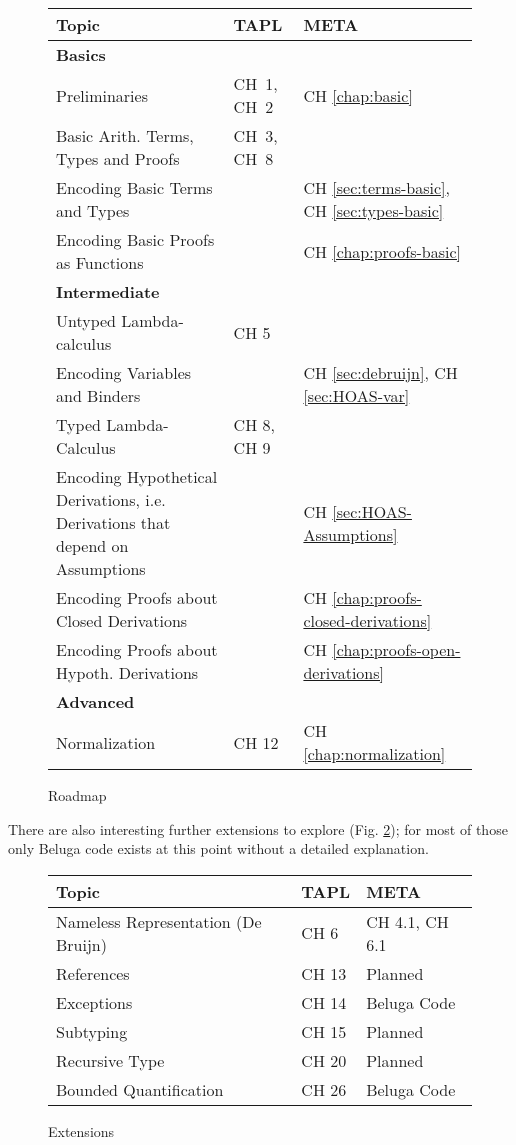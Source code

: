 \begin{figure}
  \centering
\begin{tabular}{p{8cm}|p{2.4cm}|p{3.25cm}}
 Topic & TAPL & META \\
\hline
\textbf{Basics} & & \\\hline\hline
Preliminaries & CH~1, CH~2 & CH \ref{chap:basic}\\
Basic Arith. Terms, Types and Proofs & CH~3, CH~8 &  \\
\hline
Encoding Basic Terms and Types & & CH \ref{sec:terms-basic}, CH \ref{sec:types-basic} \\
Encoding Basic Proofs as Functions & & CH \ref{chap:proofs-basic} \\
\hline  \hline
\textbf{Intermediate} & & \\\hline \hline
Untyped Lambda-calculus & CH 5  & \\
Encoding Variables and Binders & & CH \ref{sec:debruijn}, CH \ref{sec:HOAS-var} \\
\hline
Typed Lambda-Calculus & CH 8, CH 9  & \\
Encoding Hypothetical Derivations, i.e. Derivations that depend on
Assumptions & & CH \ref{sec:HOAS-Assumptions}\\
Encoding Proofs about Closed Derivations & & CH \ref{chap:proofs-closed-derivations} \\
Encoding Proofs about Hypoth. Derivations & & CH \ref{chap:proofs-open-derivations} \\
\hline\hline
\textbf{Advanced} & & \\\hline \hline
Normalization & CH 12 & CH \ref{chap:normalization}\\
\end{tabular}
  \caption{Roadmap}
  \label{fig:roadmap}
\end{figure}
There are also interesting further extensions to explore (Fig. \ref{fig:extensions}); for most of those only Beluga code exists at this point without a detailed explanation.

\begin{figure}
\begin{tabular}{p{9cm}|p{2.25cm}|p{2.75cm}}
 Topic & TAPL & META \\
\hline
Nameless Representation (De Bruijn) & CH 6 & CH 4.1, CH 6.1 \\
References & CH 13 & Planned \\
Exceptions & CH 14 & Beluga Code \\
Subtyping & CH 15 & Planned \\
Recursive Type & CH 20 & Planned\\
Bounded Quantification & CH 26 & Beluga Code \\
\end{tabular}
  \caption{Extensions}
  \label{fig:extensions}
\end{figure}


